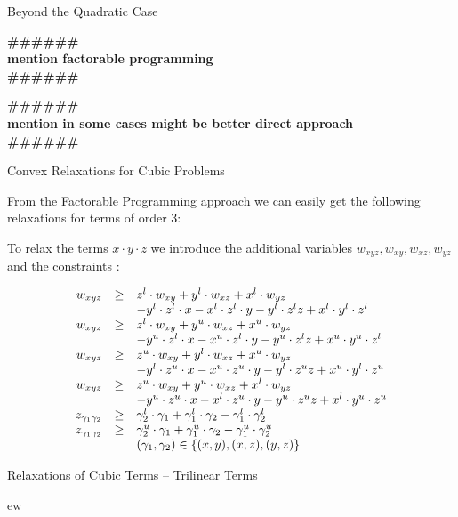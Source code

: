 \documentclass{beamer}
\newcommand{\todo}[1]
{\begin{tiny}
  \begin{center} {\color{red}
  \textbf{ {\#\#\#\hfill\#\#\#}\\{#1}\\\#\#\#\hfill\#\#\#}}
\end{center}
\end{tiny}} %
\begin{document}
\begin{frame}{Beyond the Quadratic Case}

  \todo{mention factorable programming}

  \todo{mention in some cases might be better direct approach}

\end{frame}

\begin{frame}{Convex Relaxations for Cubic Problems}

  From the Factorable Programming approach we can easily get the following relaxations for
  terms of order 3:

  To relax the terms $x \cdot y \cdot z$ we introduce the additional variables
  $w_{xyz}, w_{xy}, w_{xz}, w_{yz}$ and the constraints : 

  \begin{displaymath}
    \begin{array}[h]{rcl}
      w_{xyz} & \geq & z^l \cdot w_{xy}+ y^l \cdot w_{xz} + x^l \cdot w_{yz} \\
     &  & -y^l \cdot z^l \cdot x - x^l \cdot z^l \cdot y - y^l \cdot z^l z 
     + x^l \cdot y^l \cdot z^l \\
      w_{xyz} & \geq & z^l \cdot w_{xy}+ y^u \cdot w_{xz} + x^u \cdot w_{yz} \\
     &  & -y^u \cdot z^l \cdot x - x^u \cdot z^l \cdot y - y^u \cdot z^l z 
     + x^u \cdot y^u \cdot z^l \\
      w_{xyz} & \geq & z^u \cdot w_{xy}+ y^l \cdot w_{xz} + x^u \cdot w_{yz} \\
     &  & -y^l \cdot z^u \cdot x - x^u \cdot z^u \cdot y - y^l \cdot z^u z 
     + x^u \cdot y^l \cdot z^u \\
      w_{xyz} & \geq & z^u \cdot w_{xy}+ y^u \cdot w_{xz} + x^l \cdot w_{yz} \\
     &  & -y^u \cdot z^u \cdot x - x^l \cdot z^u \cdot y - y^u \cdot z^u z 
     + x^l \cdot y^u \cdot z^u \\
     z_{\gamma_1 \gamma_2} & \geq & \gamma_2^l \cdot \gamma_1 + \gamma_1^l \cdot \gamma_2
     - \gamma_1^l \cdot \gamma_2^l \\
     z_{\gamma_1 \gamma_2} & \geq & \gamma_2^u \cdot \gamma_1 + \gamma_1^u \cdot \gamma_2
     - \gamma_1^u \cdot \gamma_2^u \\
     &  &  (\gamma_1, \gamma_2) \in \left\{ (x,y), (x,z), (y,z) \right\} \\
    \end{array}
  \end{displaymath}
  
\end{frame}

\begin{frame}{Relaxations of Cubic Terms -- Trilinear Terms}

  ew
  
\end{frame}
\end{document}
